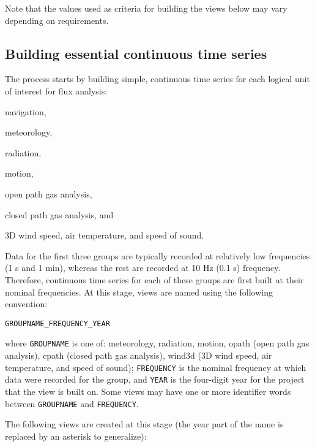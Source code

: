 \documentclass[12pt,letterpaper,titlepage,headings=small,numbers=noenddot]%
{scrartcl}
\begin{document}
Note that the values used as criteria for building the views below may vary
depending on requirements.

\subsection{Building essential continuous time series}
\label{sec:essential-time-series}

The process starts by building simple, continuous time series for each
logical unit of interest for flux analysis:
\begin{inparaenum}[a)]
\item navigation,
\item meteorology,
\item radiation,
\item motion,
\item open path gas analysis,
\item closed path gas analysis, and
\item 3D wind speed, air temperature, and speed of sound.
\end{inparaenum}

Data for the first three groups are typically recorded at relatively low
frequencies (1 s and 1 min), whereas the rest are recorded at 10 Hz (0.1 s)
frequency.  Therefore, continuous time series for each of these groups are
first built at their nominal frequencies.  At this stage, views are named
using the following convention:

\begin{verbatim}
GROUPNAME_FREQUENCY_YEAR
\end{verbatim}

where \texttt{GROUPNAME} is one of: meteorology, radiation, motion, opath
(open path gas analysis), cpath (closed path gas analysis), wind3d (3D wind
speed, air temperature, and speed of sound); \texttt{FREQUENCY} is the
nominal frequency at which data were recorded for the group, and
\texttt{YEAR} is the four-digit year for the project that the view is built
on.  Some views may have one or more identifier words between
\texttt{GROUPNAME} and \texttt{FREQUENCY}.

The following views are created at this stage (the year part of the name is
replaced by an asterisk to generalize):
\end{document}
